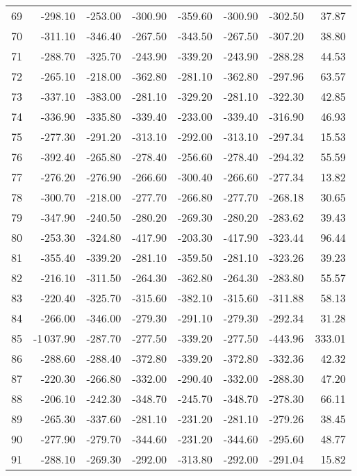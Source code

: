 \begin{longtable}{rrrrrrrr}
69 & -298.10 & -253.00 & -300.90 & -359.60 & -300.90 & -302.50 & 37.87  \\
70 & -311.10 & -346.40 & -267.50 & -343.50 & -267.50 & -307.20 & 38.80  \\
71 & -288.70 & -325.70 & -243.90 & -339.20 & -243.90 & -288.28 & 44.53  \\
72 & -265.10 & -218.00 & -362.80 & -281.10 & -362.80 & -297.96 & 63.57  \\
73 & -337.10 & -383.00 & -281.10 & -329.20 & -281.10 & -322.30 & 42.85  \\
74 & -336.90 & -335.80 & -339.40 & -233.00 & -339.40 & -316.90 & 46.93  \\
75 & -277.30 & -291.20 & -313.10 & -292.00 & -313.10 & -297.34 & 15.53  \\
76 & -392.40 & -265.80 & -278.40 & -256.60 & -278.40 & -294.32 & 55.59  \\
77 & -276.20 & -276.90 & -266.60 & -300.40 & -266.60 & -277.34 & 13.82  \\
78 & -300.70 & -218.00 & -277.70 & -266.80 & -277.70 & -268.18 & 30.65  \\
79 & -347.90 & -240.50 & -280.20 & -269.30 & -280.20 & -283.62 & 39.43  \\
80 & -253.30 & -324.80 & -417.90 & -203.30 & -417.90 & -323.44 & 96.44  \\
81 & -355.40 & -339.20 & -281.10 & -359.50 & -281.10 & -323.26 & 39.23  \\
82 & -216.10 & -311.50 & -264.30 & -362.80 & -264.30 & -283.80 & 55.57  \\
83 & -220.40 & -325.70 & -315.60 & -382.10 & -315.60 & -311.88 & 58.13  \\
84 & -266.00 & -346.00 & -279.30 & -291.10 & -279.30 & -292.34 & 31.28  \\
85 & -1\,037.90 & -287.70 & -277.50 & -339.20 & -277.50 & -443.96 & 333.01  \\
86 & -288.60 & -288.40 & -372.80 & -339.20 & -372.80 & -332.36 & 42.32  \\
87 & -220.30 & -266.80 & -332.00 & -290.40 & -332.00 & -288.30 & 47.20  \\
88 & -206.10 & -242.30 & -348.70 & -245.70 & -348.70 & -278.30 & 66.11  \\
89 & -265.30 & -337.60 & -281.10 & -231.20 & -281.10 & -279.26 & 38.45  \\
90 & -277.90 & -279.70 & -344.60 & -231.20 & -344.60 & -295.60 & 48.77  \\
91 & -288.10 & -269.30 & -292.00 & -313.80 & -292.00 & -291.04 & 15.82  \\

\end{longtable}
